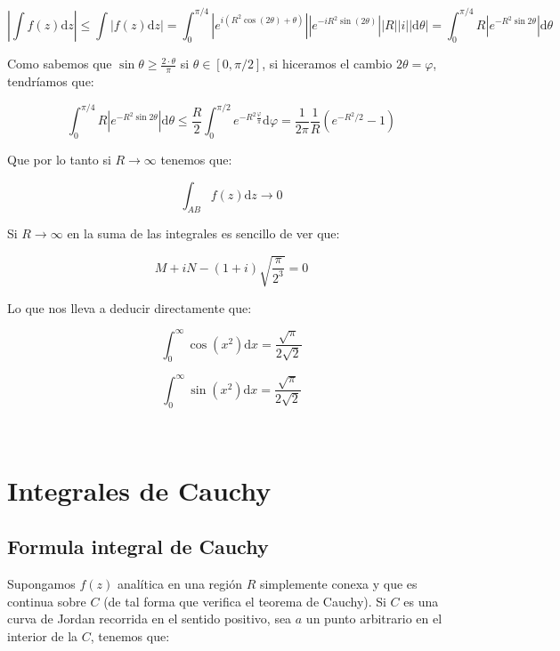 \documentclass[12pt,a4paper]{book}
\newcommand{\D}{\mathrm{d}}
\newcommand{\into}{\int_{0}^{\infty}}
\begin{document}
\begin{itemize}
$$ \left| \int f(z) \D z \right| \leq \int \left| f(z) \D z \right| = \int_{0}^{\pi/4} \left| e^{i(R^2 \cos ( 2 \theta) + \theta)}  \right| \left| e^{-i R^2 \sin(2 \theta)} \right| |R||i||\D \theta| = \int_0^{\pi/4} R \left| e^{-R^2 \sin 2 \theta} \right| \D \theta $$

Como sabemos que $\sin \theta  \geq \frac{2 \cdot \theta}{\pi}$ si $\theta \in [0,\pi/2]$, si hiceramos el cambio $2 \theta = \varphi$, tendríamos que:

$$ \int_0^{\pi/4} R \left| e^{-R^2 \sin 2 \theta} \right| \D \theta \leq \frac{R}{2} \int_0^{\pi/2} e^{-R^2 \frac{\varphi}{\pi}} \D \varphi = \dfrac{1}{2 \pi} \dfrac{1}{R} (e^{-R^2/2}-1)   $$

Que por lo tanto si $R \rightarrow \infty$ tenemos que:

$$ \int_{AB} f(z) \D z \rightarrow 0 $$


\end{itemize}

Si $R \rightarrow \infty$ en la suma de las integrales es sencillo de ver que:

$$ M + i N - (1+i)\sqrt{\dfrac{\pi}{2^3}} = 0  $$

Lo que nos lleva a deducir directamente que:

\begin{equation}
\into \cos (x^2) \D x = \dfrac{\sqrt{\pi}}{2 \sqrt{2}}
\end{equation}

\begin{equation}
\into \sin (x^2) \D x = \dfrac{\sqrt{\pi}}{2 \sqrt{2}}
\end{equation}


\hrulefill \\


\chapter{Integrales de Cauchy}

\section{Formula integral de Cauchy}

Supongamos $f(z)$ analítica en una región $R$ simplemente conexa y que es continua sobre $C$ (de tal forma que verifica el teorema de Cauchy). Si $C$ es una curva de Jordan recorrida en el sentido positivo, sea $a$ un punto arbitrario en el interior de la $C$, tenemos que: 
\end{document}
